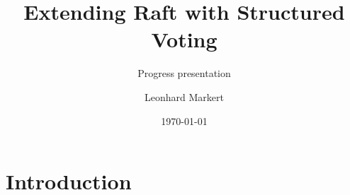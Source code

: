 \documentclass{beamer}
\title{Extending Raft with Structured Voting}
\subtitle{Progress presentation}
\author{Leonhard Markert}
\date{\today}
\begin{document}

\begin{frame}
    \titlepage
\end{frame}



\section{Introduction}



\end{document}
